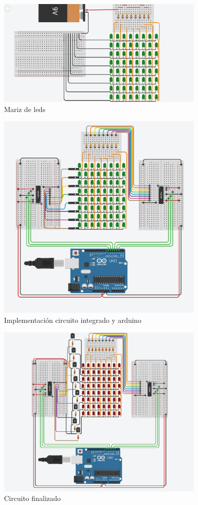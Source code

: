 \documentclass{article}
\begin{document}
\begin{figure}[h]
\includegraphics[width=10cm]{1.png}
\centering
\caption{Mariz de leds}
\label{fig:matriz de leds}
\end{figure}

\begin{figure}[h]
\includegraphics[width=10cm]{2.png}
\centering
\caption{Implementación circuito integrado y arduino}
\label{fig:implementación}
\end{figure}


\begin{figure}[h]
\includegraphics[width=10cm]{circuito finalizado.png}
\centering
\caption{Circuito finalizado}
\label{fig:circuito finalizado}
\end{figure}
\end{document}
